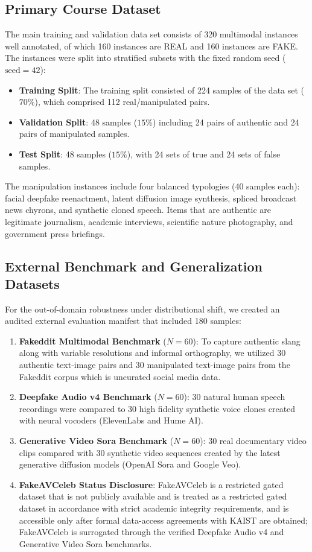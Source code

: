 \documentclass[conference]{IEEEtran}
\begin{document}
\subsection{Primary Course Dataset}
The main training and validation data set consists of 320 multimodal instances well annotated, of which 160 instances are REAL and 160 instances are FAKE. The instances were split into stratified subsets with the fixed random seed ($\text{seed} = 42$):
\begin{itemize}
    \item \textbf{Training Split}: The training split consisted of 224 samples of the data set ($70\%$), which comprised 112 real/manipulated pairs.
    \item \textbf{Validation Split}: 48 samples ($15\%$) including 24 pairs of authentic and 24 pairs of manipulated samples.
    \item \textbf{Test Split}: 48 samples ($15\%$), with 24 sets of true and 24 sets of false samples.
\end{itemize}
The manipulation instances include four balanced typologies (40 samples each): facial deepfake reenactment, latent diffusion image synthesis, spliced broadcast news chyrons, and synthetic cloned speech. Items that are authentic are legitimate journalism, academic interviews, scientific nature photography, and government press briefings.

\subsection{External Benchmark and Generalization Datasets}
For the out-of-domain robustness under distributional shift, we created an audited external evaluation manifest that included 180 samples:
\begin{enumerate}
    \item \textbf{Fakeddit Multimodal Benchmark} ($N = 60$): To capture authentic slang along with variable resolutions and informal orthography, we utilized 30 authentic text-image pairs and 30 manipulated text-image pairs from the Fakeddit corpus \cite{nakamura2020fakeddit} which is uncurated social media data.
    \item \textbf{Deepfake Audio v4 Benchmark} ($N = 60$): 30 natural human speech recordings were compared to 30 high fidelity synthetic voice clones created with neural vocoders (ElevenLabs and Hume AI).
    \item \textbf{Generative Video Sora Benchmark} ($N = 60$): 30 real documentary video clips compared with 30 synthetic video sequences created by the latest generative diffusion models (OpenAI Sora and Google Veo).
    \item \textbf{FakeAVCeleb Status Disclosure}: FakeAVCeleb is a restricted gated dataset that is not publicly available and is treated as a restricted gated dataset in accordance with strict academic integrity requirements, and is accessible only after formal data-access agreements with KAIST are obtained; FakeAVCeleb is surrogated through the verified Deepfake Audio v4 and Generative Video Sora benchmarks.
\end{enumerate}
\end{document}
